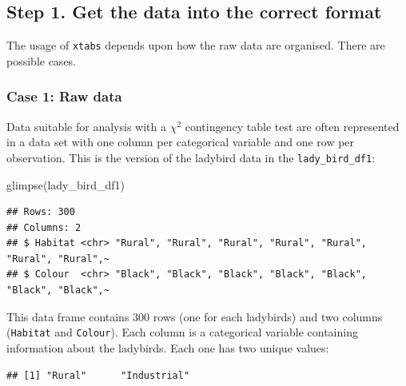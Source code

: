 \documentclass[
]{book}
\newenvironment{Shaded}{\begin{snugshade}}{\end{snugshade}}
\newcommand{\FunctionTok}[1]{\textcolor[rgb]{0.00,0.00,0.00}{#1}}
\newcommand{\NormalTok}[1]{#1}
\newcommand{\SpecialCharTok}[1]{\textcolor[rgb]{0.00,0.00,0.00}{#1}}
\begin{document}
\hypertarget{step-1.-get-the-data-into-the-correct-format}{%
\subsection{Step 1. Get the data into the correct format}\label{step-1.-get-the-data-into-the-correct-format}}

The usage of \texttt{xtabs} depends upon how the raw data are organised. There are possible cases.

\hypertarget{case-1-raw-data}{%
\subsubsection{\texorpdfstring{\textbf{Case 1: Raw data}}{Case 1: Raw data}}\label{case-1-raw-data}}

Data suitable for analysis with a \(\chi^{2}\) contingency table test are often represented in a data set with one column per categorical variable and one row per observation. This is the version of the ladybird data in the \texttt{lady\_bird\_df1}:

\begin{Shaded}
\begin{Highlighting}[]
\FunctionTok{glimpse}\NormalTok{(lady\_bird\_df1)}
\end{Highlighting}
\end{Shaded}

\begin{verbatim}
## Rows: 300
## Columns: 2
## $ Habitat <chr> "Rural", "Rural", "Rural", "Rural", "Rural", "Rural", "Rural",~
## $ Colour  <chr> "Black", "Black", "Black", "Black", "Black", "Black", "Black",~
\end{verbatim}

This data frame contains 300 rows (one for each ladybirds) and two columns (\texttt{Habitat} and \texttt{Colour}). Each column is a categorical variable containing information about the ladybirds. Each one has two unique values:

\begin{Shaded}
\end{Shaded}

\begin{verbatim}
## [1] "Rural"      "Industrial"
\end{verbatim}
\end{document}
